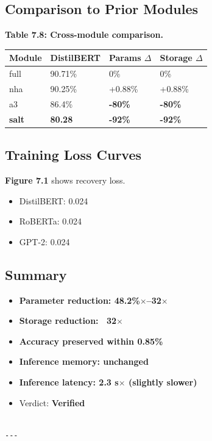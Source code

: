 \subsection{Comparison to Prior Modules}

\textbf{Table 7.8: Cross-module comparison.}

\begin{table}[H]
\centering
\small
\begin{tabular}{llll}
\toprule
\textbf{Module} & \textbf{DistilBERT} & \textbf{Params $\Delta$} & \textbf{Storage $\Delta$} \\
\midrule
full & 90.71\% & 0\% & 0\% \\
nha & 90.25\% & +0.88\% & +0.88\% \\
a3 & 86.4\% & \textbf{-80\%} & \textbf{-80\%} \\
\textbf{salt} & \textbf{80.28} & \textbf{-92\%} & \textbf{-92\%} \\
\bottomrule
\end{tabular}
\end{table}

\subsection{Training Loss Curves}

\textbf{Figure 7.1} shows recovery loss.

\begin{itemize}
\item DistilBERT: 0.024
\item RoBERTa: 0.024
\item GPT-2: 0.024

\end{itemize}
\subsection{Summary}

\begin{itemize}
\item \textbf{Parameter reduction: 48.2\%$\times$--32$\times$}
\item \textbf{Storage reduction: ~32$\times$}
\item \textbf{Accuracy preserved within 0.85\%}
\item \textbf{Inference memory: unchanged}
\item \textbf{Inference latency: 2.3 s$\times$ (slightly slower)}
\item Verdict: \textbf{Verified}
\end{itemize}
\begin{lstlisting}

---
\end{lstlisting}

